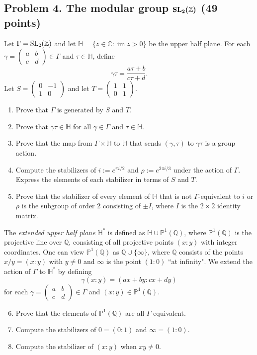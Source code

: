 \documentclass[11pt]{article}
\newcommand{\Q}{\mathbb{Q}}
\newcommand{\C}{\mathbb{C}}
\renewcommand{\H}{\mathbb{H}}
\renewcommand{\P}{\mathbb{P}}
\newcommand{\Z}{\mathbb{Z}}
\newcommand{\im}{\operatorname{im}}
\newcommand{\SL}{{\rm SL}}
\newcommand{\abcd}{\left(\begin{smallmatrix}a&b\\c&d\end{smallmatrix}\right)}
\begin{document}
\subsection*{Problem 4.  The modular group $\boldsymbol{\SL_2(\Z)}$ (49 points)}
Let $\Gamma=\SL_2(\Z)$ and let $\H=\{z\in\C:\im z > 0\}$ be the upper half plane.
For each $\gamma=\abcd\in\Gamma$ and $\tau\in\H$, define
\[
\gamma\tau = \frac{a\tau+b}{c\tau+d}.
\]
Let $S=\left(\begin{smallmatrix}0&-1\\1&0\end{smallmatrix}\right)$ and let $T=\left(\begin{smallmatrix}1&1\\0&1\end{smallmatrix}\right)$.
\begin{enumerate}[{\bf (a)}]
\item Prove that $\Gamma$ is generated by $S$ and $T$.
\item Prove that $\gamma\tau\in\H$ for all $\gamma\in\Gamma$ and $\tau\in\H$.
\item Prove that the map from $\Gamma\times\H$ to $\H$ that sends $(\gamma,\tau)$  to $\gamma\tau$ is a group action.
\item Compute the stabilizers of $i:=e^{\pi i/2}$ and $\rho:=e^{2\pi i/3}$ under the action of $\Gamma$.
Express the elements of each stabilizer in terms of $S$ and $T$.
\item Prove that  the stabilizer of every element of $\H$ that is not $\Gamma$-equivalent to $i$ or $\rho$ is the subgroup of order 2 consisting of $\pm I$, where $I$ is the $2\times 2$ identity matrix.
\end{enumerate}

The \emph{extended upper half plane} $\H^*$ is defined as $\H\cup \P^1(\Q)$, where $\P^1(\Q)$ is the projective line over $\Q$,
consisting of all projective points $(x:y)$ with integer coordinates.
One can view $\P^1(\Q)$ as $\Q\cup\{\infty\}$, where $\Q$ consists of the points $x/y=(x:y)$ with $y\ne 0$ and $\infty$ is the point $(1:0)$ ``at infinity".
We extend the action of $\Gamma$ to $\H^*$ by defining
\[
\gamma(x:y)=(ax+by:cx+dy)
\]
for each $\gamma=\abcd\in \Gamma$ and $(x:y)\in\P^1(\Q)$.

\begin{enumerate}[{\bf(a)}]
\setcounter{enumi}{5}
\item Prove that the elements of $\P^1(\Q)$ are all $\Gamma$-equivalent.
\item Compute the stabilizers of $0=(0:1)$ and $\infty=(1:0)$.
\item Compute the stabilizer of $(x:y)$ when $xy\ne 0$.
\end{enumerate}
\end{document}
